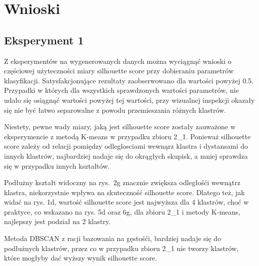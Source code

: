 \documentclass[12pt]{article}
\begin{document}
\section{Wnioski}

\subsection*{Eksperyment 1}

Z eksperymentów na wygenerowanych danych można wyciągnąć wnioski o częściowej użyteczności miary silhouette score przy dobieraniu parametrów klasyfikacji.
Satysfakcjonujące rezultaty zaobserwowano dla wartości powyżej $0.5$.
Przypadki w których dla wszystkich sprawdzonych wartości parametrów, nie udało się osiągnąć wartości powyżej tej wartości,
przy wizualnej inspekcji okazały się nie być łatwo separowalne z powodu przemieszania różnych klastrów.

Niestety, pewne wady miary, jaką jest silhouette score zostały zauważone w eksperymencie z metodą K-means w przypadku zbioru 2\_1.
Ponieważ silhouette score zależy od relacji pomiędzy odleglosciami wewnąrz klastra i dystansami do innych klastrów, najbardziej nadaje się do okrągłych skupisk, a mniej sprawdza się w przypadku innych kształtów.

Podłużny kształt widoczny na rys.~2g znacznie zwiększa odległośći wewnątrz klastra, niekorzystnie wpływa na skuteczność silhouette score.
Dlatego też, jak widać na rys. 1d, wartość silhouette score jest najwyższa dla 4 klastrów,
choć w praktyce, co wskazano na rys. 5d oraz 6g, dla zbioru 2\_1 i metody K-means, najlepszy jest podział na 2 klastry.

Metoda DBSCAN z racji bazowania na gęstośći, bardziej nadaje się do podłużnych klastrów, przez co w przypadku zbioru 2\_1 nie tworzy klastrów, które mogłyby dać wyższy wynik silhouette score.
\end{document}
